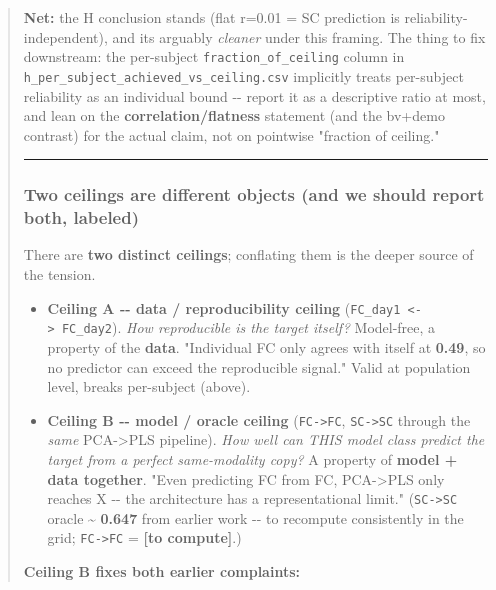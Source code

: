 \begin{quote}
\textbf{Net:} the H conclusion stands (flat r=0.01 = SC prediction is reliability-independent), and it\textquotesingle s arguably \emph{cleaner} under this framing. The thing to fix downstream: the per-subject \texttt{fraction\_of\_ceiling} column in \texttt{h\_per\_subject\_achieved\_vs\_ceiling.csv} implicitly treats per-subject reliability as an individual bound -\/- report it as a descriptive ratio at most, and lean on the \textbf{correlation/flatness} statement (and the bv+demo contrast) for the actual claim, not on pointwise "fraction of ceiling."

\begin{center}\rule{0.5\linewidth}{0.5pt}\end{center}

\subsubsection{Two ceilings are different objects (and we should report both, labeled)}\label{two-ceilings-are-different-objects-and-we-should-report-both-labeled}

There are \textbf{two distinct ceilings}; conflating them is the deeper source of the tension.

\begin{itemize}
\tightlist
\item
  \textbf{Ceiling A -\/- data / reproducibility ceiling} (\texttt{FC\_day1\ \textless{}-\textgreater{}\ FC\_day2}). \emph{How reproducible is the target itself?} Model-free, a property of the \textbf{data}. "Individual FC only agrees with itself at \textbf{0.49}, so no predictor can exceed the reproducible signal." Valid at population level, breaks per-subject (above).
\item
  \textbf{Ceiling B -\/- model / oracle ceiling} (\texttt{FC-\textgreater{}FC}, \texttt{SC-\textgreater{}SC} through the \emph{same} PCA-\textgreater PLS pipeline). \emph{How well can THIS model class predict the target from a perfect same-modality copy?} A property of \textbf{model + data together}. "Even predicting FC from FC, PCA-\textgreater PLS only reaches X -\/- the architecture has a representational limit." (\texttt{SC-\textgreater{}SC} oracle \textasciitilde{} \textbf{0.647} from earlier work -\/- to recompute consistently in the grid; \texttt{FC-\textgreater{}FC} = \textbf{{[}to compute{]}}.)
\end{itemize}

\textbf{Ceiling B fixes both earlier complaints:}


\end{quote}
